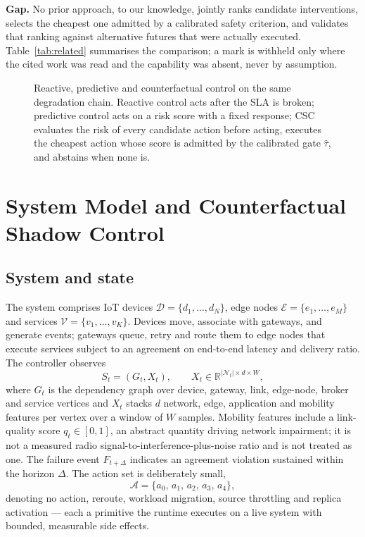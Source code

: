 \documentclass[journal]{IEEEtran}
\newcommand{\Rsafe}{\hat{\tau}}   %
\newcommand{\Aset}{\mathcal{A}}
\begin{document}
\textbf{Gap.}
No prior approach, to our knowledge, jointly ranks candidate interventions,
selects the cheapest one admitted by a calibrated safety criterion, and
validates that ranking against alternative futures that were actually executed.
Table~\ref{tab:related} summarises the comparison; a mark is withheld only where
the cited work was read and the capability was absent, never by assumption.



\begin{figure}[!t]
\centering

\caption{Reactive, predictive and counterfactual control on the same
degradation chain. Reactive control acts after the SLA is broken; predictive
control acts on a risk score with a fixed response; CSC evaluates the risk of
every candidate action before acting, executes the cheapest action whose
score is admitted by the calibrated gate $\Rsafe$, and abstains when none is.}
\label{fig:concept}
\end{figure}

\section{System Model and Counterfactual Shadow Control}

\subsection{System and state}
The system comprises IoT devices $\mathcal{D}=\{d_1,\dots,d_N\}$, edge nodes
$\mathcal{E}=\{e_1,\dots,e_M\}$ and services $\mathcal{V}=\{v_1,\dots,v_K\}$.
Devices move, associate with gateways, and generate events; gateways queue,
retry and route them to edge nodes that execute services subject to an agreement
on end-to-end latency and delivery ratio. The controller observes
\begin{equation}
S_t=(G_t,X_t),\qquad
X_t\in\mathbb{R}^{|\mathcal{N}_t|\times d\times W},
\label{eq:state}
\end{equation}
where $G_t$ is the dependency graph over device, gateway, link, edge-node,
broker and service vertices and $X_t$ stacks $d$ network, edge, application and
mobility features per vertex over a window of $W$ samples. Mobility features
include a link-quality score $q_t\in[0,1]$, an abstract quantity driving network
impairment; it is not a measured radio signal-to-interference-plus-noise ratio
and is not treated as one. The failure event $F_{t+\Delta}$ indicates an
agreement violation sustained within the horizon $\Delta$. The action set is
deliberately small,
\begin{equation}
\Aset=\{a_0,\,a_1,\,a_2,\,a_3,\,a_4\},
\label{eq:actions}
\end{equation}
denoting no action, reroute, workload migration, source throttling and replica
activation --- each a primitive the runtime executes on a live system with
bounded, measurable side effects.
\end{document}

